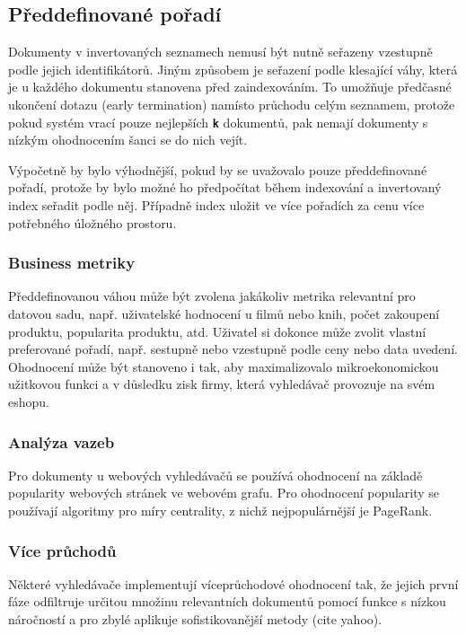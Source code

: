 \documentclass[11pt,letterpaper,oneside,openright]{book}
\newcommand{\bftt}[1]{\texttt{\textbf{#1}}}
\begin{document}
\subsection{Předdefinované pořadí}
Dokumenty v invertovaných seznamech nemusí být nutně seřazeny vzestupně podle
jejich identifikátorů. Jiným způsobem je seřazení podle klesající váhy, která
je u každého dokumentu stanovena před zaindexováním. To umožňuje předčasné
ukončení dotazu (early termination) namísto průchodu celým seznamem, protože
pokud systém vrací pouze nejlepších \bftt{k} dokumentů, pak nemají dokumenty s
nízkým ohodnocením šanci se do nich vejít.

Výpočetně by bylo výhodnější, pokud by se uvažovalo pouze předdefinované
pořadí, protože by bylo možné ho předpočítat během indexování a invertovaný
index seřadit podle něj. Případně index uložit ve více pořadích za cenu více
potřebného úložného prostoru.

\subsubsection{Business metriky}
Předdefinovanou váhou může být zvolena jakákoliv metrika relevantní pro datovou
sadu, např. uživatelské hodnocení u filmů nebo knih, počet zakoupení produktu,
popularita produktu, atd. Uživatel si dokonce může zvolit vlastní preferované
pořadí, např. sestupně nebo vzestupně podle ceny nebo data uvedení. Ohodnocení
může být stanoveno i tak, aby maximalizovalo mikroekonomickou užitkovou funkci
a v důsledku zisk firmy, která vyhledávač provozuje na svém eshopu.


\subsubsection{Analýza vazeb}
Pro dokumenty u webových vyhledávačů se používá ohodnocení na základě
popularity webových stránek ve webovém grafu. Pro ohodnocení popularity se
používají algoritmy pro míry centrality, z nichž nejpopulárnější je PageRank.

\subsubsection{Více průchodů}
Některé vyhledávače implementují víceprůchodové ohodnocení tak, že jejich první
fáze odfiltruje určitou množinu relevantních dokumentů pomocí funkce s nízkou
náročností a pro zbylé aplikuje sofistikovanější metody (cite yahoo).
\end{document}
